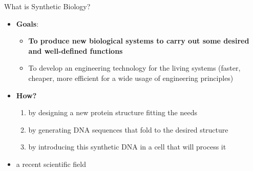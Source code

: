 \begin{frame}{What is Synthetic Biology?}
\footnotesize

\begin{itemize}
\item \textbf{Goals}: 
\begin{itemize}
\footnotesize
\item \textbf{To produce new biological systems to carry out some desired and well-defined functions}
\item To develop an engineering technology for the living systems (faster, cheaper, more efficient for a wide usage of engineering principles)
\end{itemize}
\item \textbf{How?}
\begin{enumerate}
\footnotesize
\item by designing a new protein structure fitting the needs
\item by generating DNA sequences that fold to the desired structure
\item by introducing this synthetic DNA in a cell that will process it
\end{enumerate}

\item a recent scientific field \\

\begin{columns}[c] %

\setlength\fboxsep{0pt}
\setlength\fboxrule{0.5pt}
\end{columns}

\end{itemize}
\end{frame}

